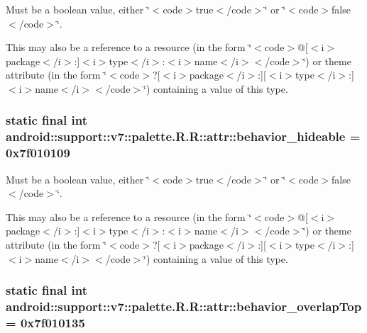 Must be a boolean value, either \char`\"{}$<$code$>$true$<$/code$>$\char`\"{} or \char`\"{}$<$code$>$false$<$/code$>$\char`\"{}. 

This may also be a reference to a resource (in the form \char`\"{}$<$code$>$@\mbox{[}$<$i$>$package$<$/i$>$:\mbox{]}$<$i$>$type$<$/i$>$:$<$i$>$name$<$/i$>$$<$/code$>$\char`\"{}) or theme attribute (in the form \char`\"{}$<$code$>$?\mbox{[}$<$i$>$package$<$/i$>$:\mbox{]}\mbox{[}$<$i$>$type$<$/i$>$:\mbox{]}$<$i$>$name$<$/i$>$$<$/code$>$\char`\"{}) containing a value of this type. \hypertarget{classandroid_1_1support_1_1v7_1_1palette_1_1_r_1_1attr_acb70a0ba335d73003a63a213a5fcc01}{
\subsubsection[{behavior\_\-hideable}]{\setlength{\rightskip}{0pt plus 5cm}static final int android::support::v7::palette.R.R::attr::behavior\_\-hideable = 0x7f010109}}
\label{classandroid_1_1support_1_1v7_1_1palette_1_1_r_1_1attr_acb70a0ba335d73003a63a213a5fcc01}


Must be a boolean value, either \char`\"{}$<$code$>$true$<$/code$>$\char`\"{} or \char`\"{}$<$code$>$false$<$/code$>$\char`\"{}. 

This may also be a reference to a resource (in the form \char`\"{}$<$code$>$@\mbox{[}$<$i$>$package$<$/i$>$:\mbox{]}$<$i$>$type$<$/i$>$:$<$i$>$name$<$/i$>$$<$/code$>$\char`\"{}) or theme attribute (in the form \char`\"{}$<$code$>$?\mbox{[}$<$i$>$package$<$/i$>$:\mbox{]}\mbox{[}$<$i$>$type$<$/i$>$:\mbox{]}$<$i$>$name$<$/i$>$$<$/code$>$\char`\"{}) containing a value of this type. \hypertarget{classandroid_1_1support_1_1v7_1_1palette_1_1_r_1_1attr_225b96e039e56beb14e5e5043676eafa}{
\subsubsection[{behavior\_\-overlapTop}]{\setlength{\rightskip}{0pt plus 5cm}static final int android::support::v7::palette.R.R::attr::behavior\_\-overlapTop = 0x7f010135}}
\label{classandroid_1_1support_1_1v7_1_1palette_1_1_r_1_1attr_225b96e039e56beb14e5e5043676eafa}


